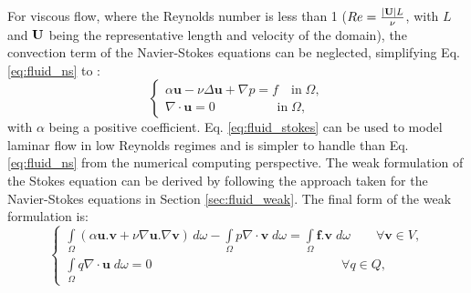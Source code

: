 For viscous flow, where the Reynolds number is less than 1 ($Re = {|{\bf U}|L \over \nu}$, with $L$ and $\bf U$ being the representative length and velocity of the domain), the convection term of the Navier-Stokes equations can be neglected, simplifying Eq. \ref{eq:fluid_ns} to \cite{Quarteroni2014}:
\begin{equation} \label{eq:fluid_stokes}
\left\{ {\begin{array}{*{20}{l}}
\displaystyle  {\alpha \mathbf{u} - \nu\Delta \mathbf{u} + \nabla p = f\quad \text{in}\;\Omega ,} \\ 
\displaystyle  {\nabla\cdot\mathbf{u} = 0\quad \quad \quad \quad \;\;\;\text{in}\;\Omega ,}
\end{array}} \right.
\end{equation}
with $\alpha$ being a positive coefficient. Eq. \ref{eq:fluid_stokes} can be used to model laminar flow in low Reynolds regimes and is simpler to handle than Eq. \ref{eq:fluid_ns} from the numerical computing perspective. The weak formulation of the Stokes equation can be derived by following the approach taken for the Navier-Stokes equations in Section \ref{sec:fluid_weak}. The final form of the weak formulation is:
\begin{equation} \label{eq:fluid_stokes_weak}
\left\{ {\begin{array}{*{20}{l}}
\displaystyle  {\int\limits_\Omega  {(\alpha {\mathbf{u}}.{\mathbf{v}} + \nu\nabla {\mathbf{u}}.\nabla {\mathbf{v}})\,} d\omega  - \int\limits_\Omega  {p\nabla\cdot{\mathbf{v}}\;d\omega  = } \int\limits_\Omega  {{\mathbf{f}}.{\mathbf{v}}\;d\omega \qquad {\forall {\mathbf{v}}} \in V,} } \\ 
\displaystyle  {\int\limits_\Omega  {q\nabla\cdot{\mathbf{u}}\;d\omega  = 0} \qquad \qquad \qquad \qquad \qquad \qquad \qquad \;\;\;{\forall {{q}}} \in Q,} 
\end{array}} \right.
\end{equation}

